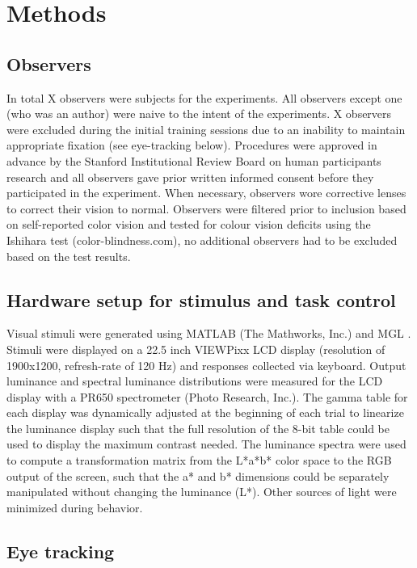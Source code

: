 \section{Methods}

\subsection{Observers}
In total X observers were subjects for the experiments. All observers except one (who was an author) were naive to the intent of the experiments. X observers were excluded during the initial training sessions due to an inability to maintain appropriate fixation (see eye-tracking below). Procedures were approved in advance by the Stanford Institutional Review Board on human participants research and all observers gave prior written informed consent before they participated in the experiment. When necessary, observers wore corrective lenses to correct their vision to normal. Observers were filtered prior to inclusion based on self-reported color vision and tested for colour vision deficits using the Ishihara test (color-blindness.com), no additional observers had to be excluded based on the test results. 

\subsection{Hardware setup for stimulus and task control}

Visual stimuli were generated using MATLAB (The Mathworks, Inc.) and MGL \citep{Gardner2018-uq}. Stimuli were displayed on a 22.5 inch VIEWPixx LCD display (resolution of 1900x1200, refresh-rate of 120 Hz) and responses collected via keyboard. Output luminance and spectral luminance distributions were measured for the LCD display with a PR650 spectrometer (Photo Research, Inc.). The gamma table for each display was dynamically adjusted at the beginning of each trial to linearize the luminance display such that the full resolution of the 8-bit table could be used to display the maximum contrast needed. The luminance spectra were used to compute a transformation matrix from the L*a*b* color space to the RGB output of the screen, such that the a* and b* dimensions could be separately manipulated without changing the luminance (L*). Other sources of light were minimized during behavior.

\subsection{Eye tracking}

